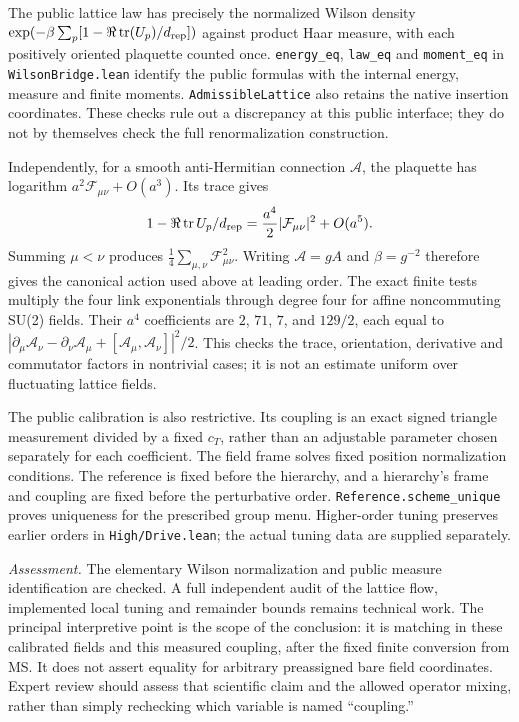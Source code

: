 \documentclass[11pt]{article}
\newcommand{\tr}{\operatorname{tr}}
\newcommand{\code}[1]{{\small\nolinkurl{#1}}}
\begin{document}
The public lattice law has precisely the normalized Wilson density
$\exp(-\beta\sum_p[1-\Re\tr(U_p)/d_{\rm rep}])$ against product Haar
measure, with each positively oriented plaquette counted once.
\code{energy_eq}, \code{law_eq} and \code{moment_eq} in
\code{WilsonBridge.lean}
identify the public formulas with the internal energy, measure and finite
moments. \code{AdmissibleLattice} also retains the native insertion
coordinates. These checks rule out a discrepancy at this public interface;
they do not by themselves check the full renormalization construction.

Independently, for a smooth anti-Hermitian connection $\mathcal A$,
the plaquette has logarithm $a^2\mathcal F_{\mu\nu}+O(a^3)$. Its trace gives
\[
 1-\Re\tr U_p/d_{\rm rep}
  =\frac{a^4}{2}|\mathcal F_{\mu\nu}|^2+O(a^5).
\]
Summing $\mu<\nu$ produces $\tfrac14\sum_{\mu,\nu}\mathcal F_{\mu\nu}^2$.
Writing $\mathcal A=gA$ and $\beta=g^{-2}$ therefore gives the canonical
action used above at leading order. The exact finite tests multiply the
four link exponentials through degree four for affine noncommuting SU(2)
fields. Their $a^4$ coefficients are $2$, $71$, $7$, and $129/2$, each equal
to $|\partial_\mu\mathcal A_\nu-\partial_\nu\mathcal A_\mu+
[\mathcal A_\mu,\mathcal A_\nu]|^2/2$. This checks the trace, orientation,
derivative and commutator factors in nontrivial cases; it is not an estimate
uniform over fluctuating lattice fields.

The public calibration is also restrictive. Its coupling is an exact signed
triangle measurement divided by a fixed $c_T$, rather than an adjustable
parameter chosen separately for each coefficient. The field frame solves
fixed position normalization conditions. The reference is fixed before
the hierarchy, and a hierarchy's frame and coupling are fixed before the
perturbative order. \code{Reference.scheme_unique} proves uniqueness for
the prescribed group menu. Higher-order tuning preserves earlier orders
in \code{High/Drive.lean}; the actual tuning data are supplied separately.

\emph{Assessment.} The elementary Wilson normalization and public measure
identification are checked. A full independent audit of the lattice flow,
implemented local tuning and remainder bounds remains technical work.
The principal interpretive point is the scope of the conclusion: it is
matching in these calibrated fields and this measured coupling, after the
fixed finite conversion from MS. It does not assert equality for arbitrary
preassigned bare field coordinates. Expert review should assess that
scientific claim and the allowed operator mixing, rather than simply
rechecking which variable is named ``coupling.''
\end{document}
